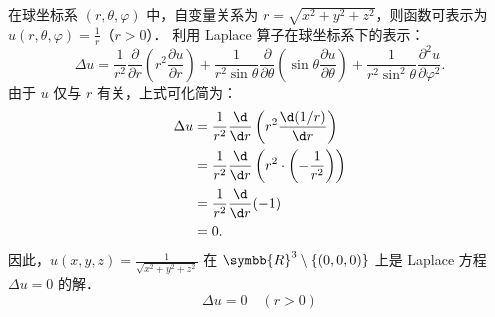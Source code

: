 \begin{solution}
    在球坐标系 $(r, \theta, \varphi)$ 中，自变量关系为 $r = \sqrt{x^2+y^2+z^2}$，则函数可表示为 $u(r, \theta, \varphi) = \frac{1}{r}$（$r>0$）．
    利用 Laplace 算子在球坐标系下的表示：
    \begin{equation}
        \Delta u = \frac{1}{r^2} \frac{\partial}{\partial r} \left( r^2 \frac{\partial u}{\partial r} \right) + \frac{1}{r^2 \sin\theta} \frac{\partial}{\partial \theta} \left( \sin\theta \frac{\partial u}{\partial \theta} \right) + \frac{1}{r^2 \sin^2\theta} \frac{\partial^2 u}{\partial \varphi^2}.
    \end{equation}
    由于 $u$ 仅与 $r$ 有关，上式可化简为：
    \begin{equation}
        \begin{aligned}
            \Delta u & = \frac{1}{r^2} \frac{\d}{\d r} \left( r^2 \frac{\d(1/r)}{\d r} \right)                \\
                     & = \frac{1}{r^2} \frac{\d}{\d r} \left( r^2 \cdot \left( -\frac{1}{r^2} \right) \right) \\
                     & = \frac{1}{r^2} \frac{\d}{\d r} (-1)                                                   \\
                     & = 0.
        \end{aligned}
    \end{equation}
    因此，$u(x,y,z) = \frac{1}{\sqrt{x^2+y^2+z^2}}$ 在 $\symbb{R}^3\setminus\{(0,0,0)\}$ 上是 Laplace 方程 $\Delta u = 0$ 的解．
    \begin{equation}
        \boxed{\Delta u = 0 \quad (r>0)}
    \end{equation}
\end{solution}

\endinput
